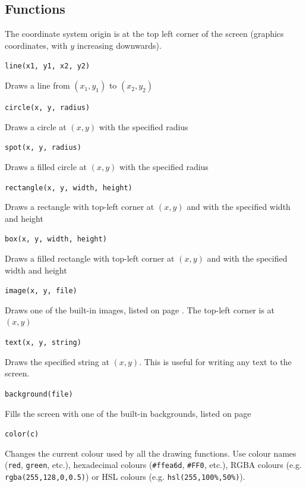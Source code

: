 \documentclass[12pt,a4paper,twoside]{article}
\renewcommand{\_}{\texttt{\symbol{95}}}
\begin{document}
\subsection{Functions}

The coordinate system origin is at the top left corner of the
screen (graphics coordinates, with $y$ increasing downwards).

\begin{bulletlist}
\item \verb^line(x1, y1, x2, y2)^

	Draws a line from $(x_1,y_1)$ to $(x_2,y_2)$

\item \verb^circle(x, y, radius)^

	Draws a circle at $(x,y)$ with the specified radius

\item \verb^spot(x, y, radius)^

	Draws a filled circle at $(x,y)$ with the specified radius

\item \verb^rectangle(x, y, width, height)^

	Draws a rectangle with top-left corner at $(x,y)$ and with the specified width and height

\item \verb^box(x, y, width, height)^

	Draws a filled rectangle with top-left corner at $(x,y)$ and with the specified width and height

\item \verb^image(x, y, file)^

	Draws one of the built-in images, listed on page \pageref{images}. The top-left corner is at $(x,y)$
\item \verb^text(x, y, string)^

	Draws the specified string at $(x,y)$. This is useful for writing any text to the screen.
\item \verb^background(file)^

	Fills the screen with one of the built-in backgrounds, listed on page \pageref{backgrounds}
\item \verb^color(c)^

	Changes the current colour used by all the drawing functions. Use colour names (\verb^red^, \verb^green^, etc.), hexadecimal colours (\verb^#ffea6d^, \verb^#FF0^, etc.), RGBA colours (e.g. \verb^rgba(255,128,0,0.5)^) or HSL colours (e.g. \verb^hsl(255,100%,50%)^).
\end{bulletlist}
\end{document}
